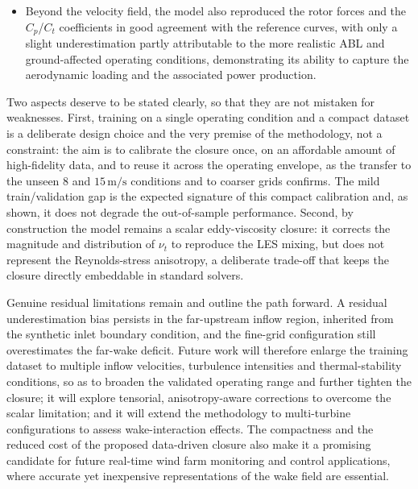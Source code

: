 \begin{itemize}
    \item Beyond the velocity field, the model also reproduced the rotor
    forces and the $C_p$/$C_t$ coefficients in good agreement with the
    reference curves, with only a slight underestimation partly
    attributable to the more realistic ABL and ground-affected operating
    conditions, demonstrating its ability to capture the aerodynamic
    loading and the associated power production.
\end{itemize}

Two aspects deserve to be stated clearly, so that they are not mistaken
for weaknesses. First, training on a single operating condition and a
compact dataset is a deliberate design choice and the very premise of the
methodology, not a constraint: the aim is to calibrate the closure once,
on an affordable amount of high-fidelity data, and to reuse it across the
operating envelope, as the transfer to the unseen $8$ and
$15\,\mathrm{m/s}$ conditions and to coarser grids confirms. The mild
train/validation gap is the expected signature of this compact
calibration and, as shown, it does not degrade the out-of-sample
performance. Second, by construction the model remains a scalar
eddy-viscosity closure: it corrects the magnitude and distribution of
$\nu_t$ to reproduce the LES mixing, but does not represent the
Reynolds-stress anisotropy, a deliberate trade-off that keeps the closure
directly embeddable in standard solvers.

Genuine residual limitations remain and outline the path forward. A
residual underestimation bias persists in the far-upstream inflow region,
inherited from the synthetic inlet boundary condition, and the fine-grid
configuration still overestimates the far-wake deficit. Future work will
therefore enlarge the training dataset to multiple inflow velocities,
turbulence intensities and thermal-stability conditions, so as to broaden
the validated operating range and further tighten the closure; it will
explore tensorial, anisotropy-aware corrections to overcome the scalar
limitation; and it will extend the methodology to multi-turbine
configurations to assess wake-interaction effects. The compactness and
the reduced cost of the proposed data-driven closure also make it a
promising candidate for future real-time wind farm monitoring and control
applications, where accurate yet inexpensive representations of the wake
field are essential.
